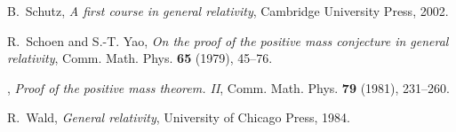 \documentclass[10pt]{amsart}
\theoremstyle{definition}
\theoremstyle{remark}
\begin{document}
\begin{thebibliography}{MTW73}
B.~Schutz, \emph{A first course in general relativity}, Cambridge University
  Press, 2002.

R.~Schoen and S.-T. Yao, \emph{On the proof of the positive mass conjecture in general relativity}, Comm. Math.
  Phys. \textbf{65} (1979), 45--76.

\bysame, \emph{Proof of the positive mass theorem. II}, Comm. Math. Phys.
  \textbf{79} (1981), 231--260.

R.~Wald, \emph{General relativity}, University of Chicago Press, 1984.

\end{thebibliography}
\end{document}
